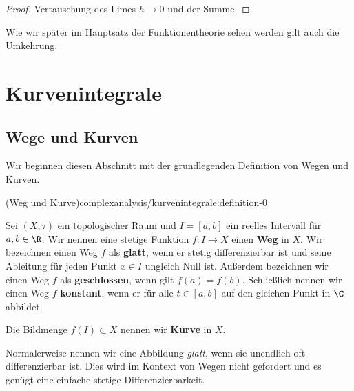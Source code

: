 \documentclass[letterpaper,10pt,german]{jupyterBook}
\begin{document}
\begin{proof}
 Vertauschung des Limes \(h \rightarrow 0\) und der Summe.
\end{proof}

\par
Wie wir später im Hauptsatz der Funktionentheorie sehen werden gilt auch die Umkehrung.


\section{Kurvenintegrale}
\label{\detokenize{complexanalysis/kurvenintegrale:kurvenintegrale}}\label{\detokenize{complexanalysis/kurvenintegrale::doc}}

\subsection{Wege und Kurven}
\label{\detokenize{complexanalysis/kurvenintegrale:wege-und-kurven}}
\par
Wir beginnen diesen Abschnitt mit der grundlegenden Definition von Wegen und Kurven.
\begin{definition}{(Weg und Kurve)}{complexanalysis/kurvenintegrale:definition-0}



\par
Sei \((X,\tau)\) ein topologischer Raum und \(I = [a,b]\) ein reelles Intervall für \(a,b \in \R\).
Wir nennen eine stetige Funktion \(f \colon I \rightarrow X\) einen \textbf{Weg} in \(X\).
Wir bezeichnen einen Weg \(f\) als \textbf{glatt}, wenn er stetig differenzierbar ist und seine Ableitung für jeden Punkt \(x \in I\) ungleich Null ist.
Außerdem bezeichnen wir einen Weg \(f\) als \textbf{geschlossen}, wenn gilt \(f(a) = f(b)\).
Schließlich nennen wir einen Weg \(f\) \textbf{konstant}, wenn er für alle \(t \in [a,b]\) auf den gleichen Punkt in \(\C\) abbildet.

\par
Die Bildmenge \(f(I) \subset X\) nennen wir \textbf{Kurve} in \(X\).
\end{definition}

\begin{emphBox}{}{}
\par
Normalerweise nennen wir eine Abbildung \emph{glatt}, wenn sie unendlich oft differenzierbar ist.
Dies wird im Kontext von Wegen nicht gefordert und es genügt eine einfache stetige Differenzierbarkeit.
\end{emphBox}
\end{document}
